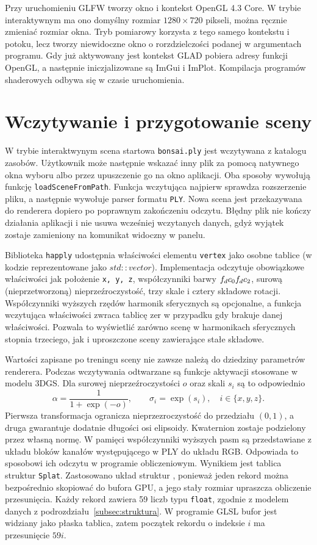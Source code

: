 Przy uruchomieniu GLFW tworzy okno i kontekst OpenGL 4.3 Core. W trybie interaktywnym ma ono domyślny rozmiar $1280\times720$ pikseli, można ręcznie zmieniać rozmiar okna. Tryb pomiarowy korzysta z tego samego kontekstu i potoku, lecz tworzy niewidoczne okno o rorzdzielczości podanej w argumentach programu. Gdy już aktywowany jest kontekst GLAD pobiera adresy funkcji OpenGL, a następnie iniczjalizowane są ImGui i ImPlot. Kompilacja programów shaderowych odbywa się w czasie uruchomienia.
\section{Wczytywanie i przygotowanie sceny}
\label{sec:przygotowywanie}
W trybie interaktwynym scena startowa \texttt{bonsai.ply} jest wczytywana z katalogu zasobów. Użytkownik może następnie wskazać inny plik za pomocą natywnego okna wyboru albo przez upuszczenie go na okno aplikacji. Oba sposoby wywołują funkcję \texttt{loadSceneFromPath}. Funkcja wczytująca najpierw sprawdza rozszerzenie pliku, a następnie wywołuje parser formatu \texttt{PLY}. Nowa scena jest przekazywana do renderera dopiero po poprawnym zakończeniu odczytu. Błędny plik nie kończy działania aplikacji i nie usuwa wcześniej wczytanych danych, gdyż wyjątek zostaje zamieniony na komunikat widoczny w panelu.

Biblioteka \texttt{happly} udostępnia właściwości elementu \texttt{vertex} jako osobne tablice (w kodzie reprezentowane jako \texttt{$std::vector$}). Implementacja odczytuje obowiązkowe właściwości jak położenie \texttt{x, y, z}, współczynniki barwy \texttt{$f_dc_0 \- f_dc_2$}, surową (nieprzetworzoną) nieprzeźroczystość, trzy skale i cztery składowe rotacji. Współczynniki wyższych rzędów harmonik sferycznych są opcjonalne, a funkcja wczytująca właściwości zwraca tablicę zer w przypadku gdy brakuje danej właściwości. Pozwala to wyświetlić zarówno scenę w harmonikach sferycznych stopnia trzeciego, jak i uproszczone sceny zawierające stałe składowe.

Wartości zapisane po treningu sceny nie zawsze należą do dziedziny parametrów renderera. Podczas wczytywania odtwarzane są funkcje aktywacji stosowane w modelu 3DGS. Dla surowej nieprzeźroczystości $o$ oraz skali $s_i$ są to odpowiednio
\begin{equation}
  \alpha=\frac{1}{1+\exp(-o)},
  \qquad
  \sigma_i=\exp(s_i), \quad i\in\{x,y,z\}.
  \label{eq:impl_aktywacje}
\end{equation}
Pierwsza transformacja ogranicza nieprzezroczystość do przedziału $(0,1)$, a druga gwarantuje dodatnie długości osi elipsoidy. Kwaternion zostaje podzielony przez własną normę. W pamięci współczynniki wyższych pasm są przedstawiane z układu bloków kanałów występującego w PLY do układu RGB. Odpowiada to sposobowi ich odczytu w programie obliczeniowym. Wynikiem jest tablica struktur \texttt{Splat}. Zastosowano układ struktur , ponieważ jeden rekord można bezpośrednio skopiować do bufora GPU, a jego stały rozmiar upraszcza obliczenie przesunięcia. Każdy rekord zawiera 59 liczb typu \texttt{float}, zgodnie z modelem danych z podrozdziału~\ref{subsec:struktura}. W programie GLSL bufor jest widziany jako płaska tablica, zatem początek rekordu o indeksie $i$ ma przesunięcie $59i$.


